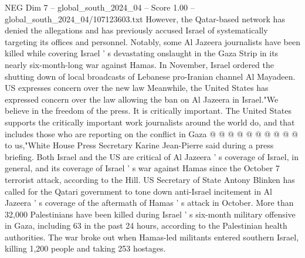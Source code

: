 \begin{textsample}{NEG Dim 7 – global\_south\_2024\_04 – Score 1.00 – global\_south\_2024\_04/107123603.txt}
However, the Qatar-based network has denied the allegations and has previously accused Israel of systematically targeting its offices and personnel.
Notably, some Al Jazeera journalists have been killed while covering Israel ' s devastating onslaught in the Gaza Strip in its nearly six-month-long war against Hamas.
In November, Israel ordered the shutting down of local broadcasts of Lebanese pro-Iranian channel Al Mayadeen.
US expresses concern over the new law Meanwhile, the United States has expressed concern over the law allowing the ban on Al Jazeera in Israel."We believe in the freedom of the press.
It is critically important.
The United States supports the critically important work journalists around the world do, and that includes those who are reporting on the conflict in Gaza @ @ @ @ @ @ @ @ @ @ to us,"White House Press Secretary Karine Jean-Pierre said during a press briefing.
Both Israel and the US are critical of Al Jazeera ' s coverage of Israel, in general, and its coverage of Israel ' s war against Hamas since the October 7 terrorist attack, according to the Hill.
US Secretary of State Antony Blinken has called for the Qatari government to tone down anti-Israel incitement in Al Jazeera ' s coverage of the aftermath of Hamas ' s attack in October.
More than 32,000 Palestinians have been killed during Israel ' s six-month military offensive in Gaza, including 63 in the past 24 hours, according to the Palestinian health authorities.
The war broke out when Hamas-led militants entered southern Israel, killing 1,200 people and taking 253 hostages.

\end{textsample}
